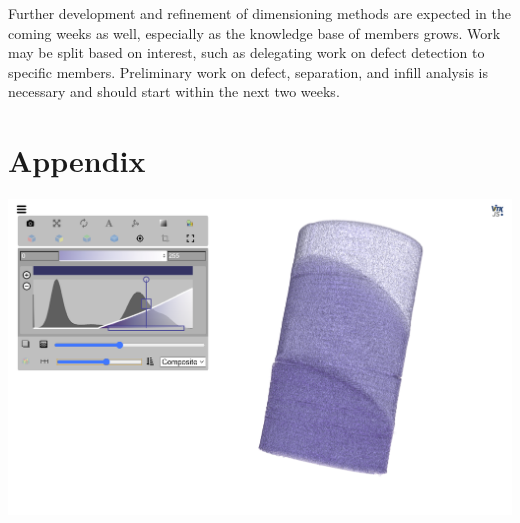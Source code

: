 \documentclass[11pt, letterpaper, notitlepage]{article}
\newenvironment{Figure}
  {\par\medskip\noindent\minipage{\linewidth}}
  {\endminipage\par\medskip}
\begin{document}
\begin{multicols}{2}
Further development and refinement of dimensioning methods are expected in the coming weeks as well, especially as the knowledge base of members grows. Work may be split based on interest, such as delegating work on defect detection to specific members. Preliminary work on defect, separation, and infill analysis is necessary and should start within the next two weeks.

\printbibliography

\end{multicols}

\section{Appendix}
\begin{Figure}
  \centering
  \includegraphics[width=6in]{images/itk.png}
  \label{fig:itk}
\end{Figure}
\end{document}
